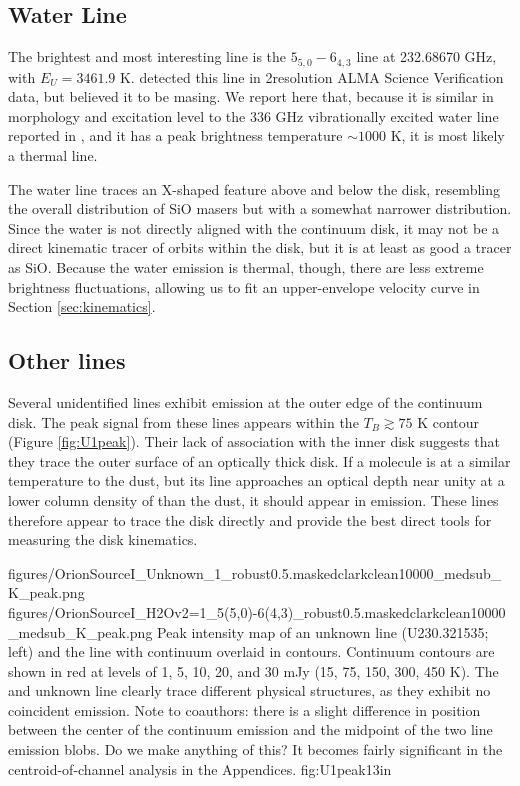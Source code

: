\documentclass[twocolumn]{aastex61}
\begin{document}
\subsection{Water Line}
The brightest and most interesting line is the \water $5_{5,0}-6_{4,3}$ line at
232.68670 GHz, with $E_U=3461.9$ K.  \citet{Hirota2012a} detected this line
in 2\arcsec resolution ALMA Science Verification data, but believed it to be
masing.  We report here that, because it is similar in morphology and
excitation level to the 336 GHz vibrationally excited water line reported in
\citet{Hirota2014a}, and it has a peak brightness temperature $\sim1000$ K, it
is most likely a thermal line.

The water line traces an X-shaped feature above and below the disk, 
resembling the overall distribution of SiO masers but with a somewhat narrower
distribution.  Since the water is not directly aligned with the continuum
disk, it may not be a direct kinematic tracer of orbits within the disk,
but it is at least as good a tracer as SiO.  Because the water emission is
thermal, though, there are less extreme brightness fluctuations, allowing
us to fit an upper-envelope velocity curve in Section \ref{sec:kinematics}.


\subsection{Other lines}
Several unidentified lines exhibit emission at the outer edge of the continuum disk.
The peak signal from these lines appears within the $T_B\gtrsim75$ K contour
(Figure \ref{fig:U1peak}).
Their lack of association with the inner disk suggests that they trace the outer
surface of an optically thick disk.
If a molecule is at a similar temperature to the dust, but its line approaches
an optical depth near unity at a lower column density of \hh than the dust,
it should appear in emission.  These lines therefore appear to trace the disk
directly and provide the best direct tools for measuring the disk kinematics.

\FigureTwo
{{figures/OrionSourceI_Unknown_1_robust0.5.maskedclarkclean10000_medsub_K_peak}.png}
{{figures/OrionSourceI_H2Ov2=1_5(5,0)-6(4,3)_robust0.5.maskedclarkclean10000_medsub_K_peak}.png}
{Peak intensity map of an unknown line (U230.321535; left) and the \water
line with continuum overlaid
in contours.  Continuum contours are shown in red at levels of 1, 5, 10, 20, and 30
mJy \perbeam (15, 75, 150, 300, 450 K).
The \water and unknown line clearly trace different physical structures, as
they exhibit no coincident emission.
{\color{red} Note to coauthors: there is a slight difference in position between the
center of the continuum emission and the midpoint of the two line emission blobs.
Do we make anything of this?  It becomes fairly significant in the centroid-of-channel
analysis in the Appendices.}
}
{fig:U1peak}{1}{3in}
\end{document}
